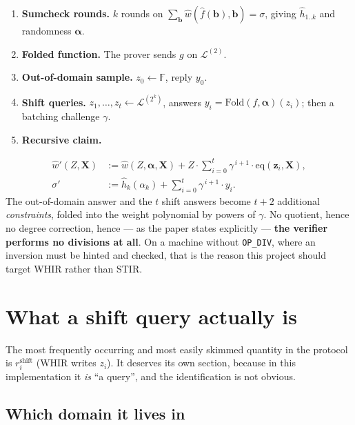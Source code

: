 \documentclass[11pt,a4paper]{article}
\newcommand{\eqp}{\mathrm{eq}}
\newcommand{\Fold}{\mathrm{Fold}}
\begin{document}
\begin{enumerate}
  \item \textbf{Sumcheck rounds.} $k$ rounds on
        $\sum_{\boldsymbol b}\hat w(\hat f(\boldsymbol b),\boldsymbol b)=\sigma$, giving
        $\hat h_{1..k}$ and randomness $\boldsymbol\alpha$.
  \item \textbf{Folded function.} The prover sends $g$ on $\mathcal{L}^{(2)}$.
  \item \textbf{Out-of-domain sample.} $z_{0}\leftarrow\mathbb{F}$, reply $y_{0}$.
  \item \textbf{Shift queries.} $z_{1},\dots,z_{t}\leftarrow\mathcal{L}^{(2^{k})}$, answers
        $y_{i}=\Fold(f,\boldsymbol\alpha)(z_{i})$; then a batching challenge $\gamma$.
  \item \textbf{Recursive claim.}
\end{enumerate}
\begin{align*}
  \hat w'(Z,\boldsymbol X) &:= \hat w(Z,\boldsymbol\alpha,\boldsymbol X)
    + Z\cdot\sum_{i=0}^{t}\gamma^{\,i+1}\cdot\eqp(\boldsymbol z_{i},\boldsymbol X),\\
  \sigma' &:= \hat h_{k}(\alpha_{k}) + \sum_{i=0}^{t}\gamma^{\,i+1}\cdot y_{i}.
\end{align*}
The out-of-domain answer and the $t$ shift answers become $t+2$ additional \emph{constraints},
folded into the weight polynomial by powers of $\gamma$. No quotient, hence no degree correction,
hence --- as the paper states explicitly --- \textbf{the verifier performs no divisions at all}. On
a machine without \texttt{OP\_DIV}, where an inversion must be hinted and checked, that is the
reason this project should target WHIR rather than STIR.

\section{What a shift query actually is}\label{sec:shift}

The most frequently occurring and most easily skimmed quantity in the protocol is
$r^{\mathrm{shift}}_{i}$ (WHIR writes $z_{i}$). It deserves its own section, because in this
implementation it \emph{is} ``a query'', and the identification is not obvious.

\subsection*{Which domain it lives in}
\end{document}
